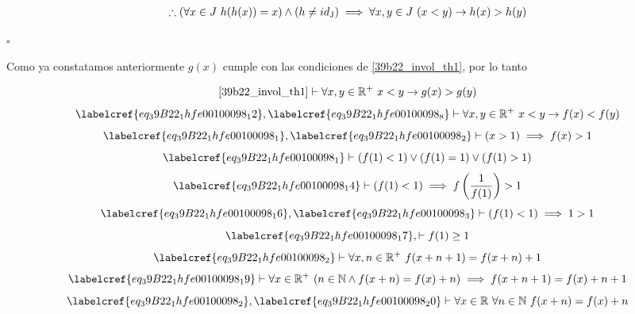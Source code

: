 \begin{equation}
\begin{gathered}
	 \therefore (\forall x \in J\ h(h(x)) = x) \land (h \neq id\textsubscript{J}) \implies \forall x,y \in J\ (x < y) \to h(x) > h(y)
\end{gathered}
\end{equation}

\hfill $\square$

Como ya constatamos anteriormente $g(x)$ cumple con las condiciones de \cref{39b22_invol_th1}, por lo tanto

\begin{equation} \label{eq_39B22_1hfe00100098_12}
	\cref{39b22_invol_th1} \vdash \forall x,y \in \mathbb{R}^{+}\ x < y \to g(x) > g(y)
\end{equation}
\begin{equation} \label{eq_39B22_1hfe00100098_13}
	\labelcref{eq_39B22_1hfe00100098_12}, \labelcref{eq_39B22_1hfe00100098_8} \vdash \forall x,y \in \mathbb{R}^{+}\ x < y \to f(x) < f(y)
\end{equation}
\begin{equation} \label{eq_39B22_1hfe00100098_14}
	\labelcref{eq_39B22_1hfe00100098_1}, \labelcref{eq_39B22_1hfe00100098_2} \vdash (x > 1) \implies f(x) > 1
\end{equation}
\begin{equation} \label{eq_39B22_1hfe00100098_15}
	\labelcref{eq_39B22_1hfe00100098_1} \vdash (f(1) < 1) \lor (f(1) = 1) \lor (f(1) > 1)
\end{equation}
\begin{equation} \label{eq_39B22_1hfe00100098_16}
	\labelcref{eq_39B22_1hfe00100098_14} \vdash (f(1) < 1) \implies f\left(\frac{1}{f(1)}\right) > 1
\end{equation}
\begin{equation} \label{eq_39B22_1hfe00100098_17}
	\labelcref{eq_39B22_1hfe00100098_16}, \labelcref{eq_39B22_1hfe00100098_3} \vdash (f(1) < 1) \implies 1 > 1
\end{equation}
\begin{equation} \label{eq_39B22_1hfe00100098_18}
	\labelcref{eq_39B22_1hfe00100098_17}, \vdash f(1) \ge 1
\end{equation}
\begin{equation} \label{eq_39B22_1hfe00100098_19}
	\labelcref{eq_39B22_1hfe00100098_2} \vdash \forall x , n \in \mathbb{R}^{+} \ f(x+ n + 1) = f(x + n) + 1
\end{equation}
\begin{equation} \label{eq_39B22_1hfe00100098_20}
	\labelcref{eq_39B22_1hfe00100098_19} \vdash \forall x \in \mathbb{R}^{+}\ (n \in \mathbb{N} \land f(x+ n) = f(x) + n) \implies f(x+n+1) = f(x) + n + 1
\end{equation}
\begin{equation} \label{eq_39B22_1hfe00100098_21}
	\labelcref{eq_39B22_1hfe00100098_2}, \labelcref{eq_39B22_1hfe00100098_20} \vdash \forall x \in \mathbb{R}\ \forall n \in \mathbb{N}\ f(x+n) = f(x) + n
\end{equation}

